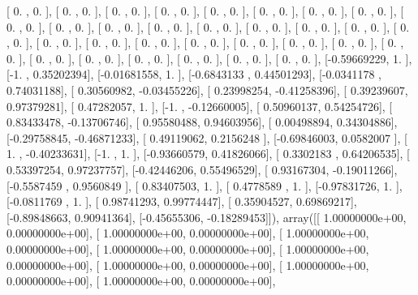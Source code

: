 \documentclass{article}
\begin{document}
       [ 0.        ,  0.        ],
       [ 0.        ,  0.        ],
       [ 0.        ,  0.        ],
       [ 0.        ,  0.        ],
       [ 0.        ,  0.        ],
       [ 0.        ,  0.        ],
       [ 0.        ,  0.        ],
       [ 0.        ,  0.        ],
       [ 0.        ,  0.        ],
       [ 0.        ,  0.        ],
       [ 0.        ,  0.        ],
       [ 0.        ,  0.        ],
       [ 0.        ,  0.        ],
       [ 0.        ,  0.        ],
       [ 0.        ,  0.        ],
       [ 0.        ,  0.        ],
       [ 0.        ,  0.        ],
       [ 0.        ,  0.        ],
       [ 0.        ,  0.        ],
       [ 0.        ,  0.        ],
       [ 0.        ,  0.        ],
       [ 0.        ,  0.        ],
       [ 0.        ,  0.        ],
       [ 0.        ,  0.        ],
       [ 0.        ,  0.        ],
       [ 0.        ,  0.        ],
       [ 0.        ,  0.        ],
       [ 0.        ,  0.        ],
       [ 0.        ,  0.        ],
       [ 0.        ,  0.        ],
       [ 0.        ,  0.        ],
       [-0.59669229,  1.        ],
       [-1.        ,  0.35202394],
       [-0.01681558,  1.        ],
       [-0.6843133 ,  0.44501293],
       [-0.0341178 ,  0.74031188],
       [ 0.30560982, -0.03455226],
       [ 0.23998254, -0.41258396],
       [ 0.39239607,  0.97379281],
       [ 0.47282057,  1.        ],
       [-1.        , -0.12660005],
       [ 0.50960137,  0.54254726],
       [ 0.83433478, -0.13706746],
       [ 0.95580488,  0.94603956],
       [ 0.00498894,  0.34304886],
       [-0.29758845, -0.46871233],
       [ 0.49119062,  0.2156248 ],
       [-0.69846003,  0.0582007 ],
       [ 1.        , -0.40233631],
       [-1.        ,  1.        ],
       [-0.93660579,  0.41826066],
       [ 0.3302183 ,  0.64206535],
       [ 0.53397254,  0.97237757],
       [-0.42446206,  0.55496529],
       [ 0.93167304, -0.19011266],
       [-0.5587459 ,  0.9560849 ],
       [ 0.83407503,  1.        ],
       [ 0.4778589 ,  1.        ],
       [-0.97831726,  1.        ],
       [-0.0811769 ,  1.        ],
       [ 0.98741293,  0.99774447],
       [ 0.35904527,  0.69869217],
       [-0.89848663,  0.90941364],
       [-0.45655306, -0.18289453]]), array([[  1.00000000e+00,   0.00000000e+00],
       [  1.00000000e+00,   0.00000000e+00],
       [  1.00000000e+00,   0.00000000e+00],
       [  1.00000000e+00,   0.00000000e+00],
       [  1.00000000e+00,   0.00000000e+00],
       [  1.00000000e+00,   0.00000000e+00],
       [  1.00000000e+00,   0.00000000e+00],
       [  1.00000000e+00,   0.00000000e+00],
\end{document}
